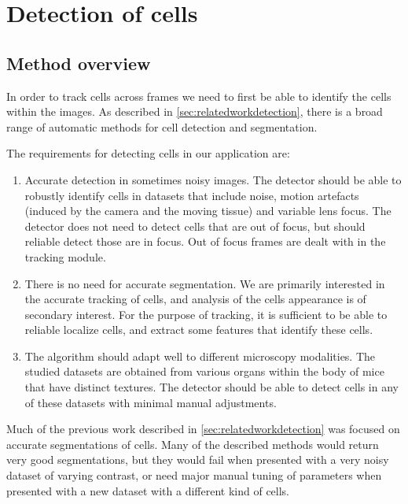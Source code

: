 \chapter{Detection of cells \statusfirstdraft}
	\label{chap:cell_detection}
	
	\section{Method overview \statusfirstdraft}
	
	In order to track cells across frames we need to first be able to identify the cells within the images. As described in \cref{sec:relatedworkdetection}, there is a broad range of automatic methods for cell detection and segmentation.
	
	The requirements for detecting cells in our application are:
		
	\begin{enumerate}
	\item Accurate detection in sometimes noisy images. The detector should be able to robustly identify cells in datasets that include noise, motion artefacts (induced by the camera and the moving tissue) and variable lens focus. The detector does not need to detect cells that are out of focus, but should reliable detect those are in focus. Out of focus frames are dealt with in the tracking module.
	
	\item There is no need for accurate segmentation. We are primarily interested in the accurate tracking of cells, and analysis of the cells appearance is of secondary interest. For the purpose of tracking, it is sufficient to be able to reliable localize cells, and extract some features that identify these cells.
	
	\item The algorithm should adapt well to different microscopy modalities. The studied datasets are obtained from various organs within the body of mice that have distinct textures. The detector should be able to detect cells in any of these datasets with minimal  manual adjustments.
	\end{enumerate}
	
	Much of the previous work described in \cref{sec:relatedworkdetection} was focused on accurate segmentations of cells. Many of the described methods would return very good segmentations, but they would fail when presented with a very noisy dataset of varying contrast, or need major manual tuning of parameters when presented with a new dataset with a different kind of cells.
	
